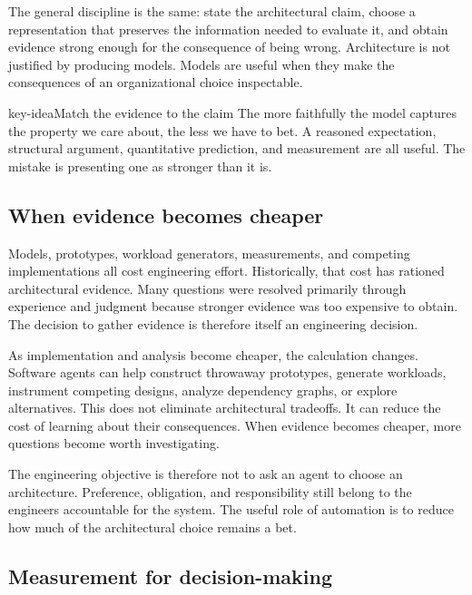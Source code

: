 The general discipline is the same: state the architectural claim, choose a representation that preserves the information needed to evaluate it, and obtain evidence strong enough for the consequence of being wrong.
Architecture is not justified by producing models.
Models are useful when they make the consequences of an organizational choice inspectable.

\begin{bookbox}{key-idea}{Match the evidence to the claim} %
The more faithfully the model captures the property we care about, the less we have to bet.
A reasoned expectation, structural argument, quantitative prediction, and measurement are all useful.
The mistake is presenting one as stronger than it is.
\end{bookbox}

\subsection{When evidence becomes cheaper}\label{sec-evidence-cheaper}

Models, prototypes, workload generators, measurements, and competing implementations all cost
engineering effort. Historically, that cost has rationed architectural evidence. Many questions
were resolved primarily through experience and judgment because stronger evidence was too expensive
to obtain. The decision to gather evidence is therefore itself an engineering decision.

As implementation and analysis become cheaper, the calculation changes. Software agents can help
construct throwaway prototypes, generate workloads, instrument competing designs, analyze
dependency graphs, or explore alternatives. This does not eliminate architectural tradeoffs. It can
reduce the cost of learning about their consequences. When evidence becomes cheaper, more questions
become worth investigating.

The engineering objective is therefore not to ask an agent to choose an architecture. Preference,
obligation, and responsibility still belong to the engineers accountable for the system. The useful
role of automation is to reduce how much of the architectural choice remains a bet.

\subsection{Measurement for decision-making}\label{sec-measurement-architecture}

